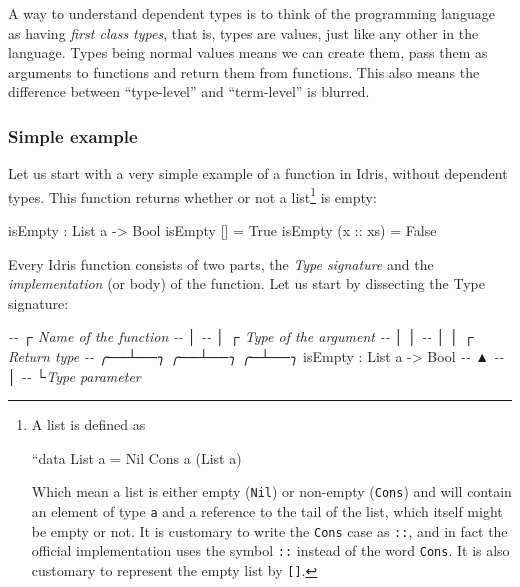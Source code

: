 \documentclass[
]{article}
\newenvironment{Shaded}{}{}
\newcommand{\CommentTok}[1]{\textcolor[rgb]{0.38,0.63,0.69}{\textit{#1}}}
\newcommand{\DataTypeTok}[1]{\textcolor[rgb]{0.56,0.13,0.00}{#1}}
\newcommand{\NormalTok}[1]{#1}
\newcommand{\OperatorTok}[1]{\textcolor[rgb]{0.40,0.40,0.40}{#1}}
\newcommand{\OtherTok}[1]{\textcolor[rgb]{0.00,0.44,0.13}{#1}}
\begin{document}
A way to understand dependent types is to think of the programming
language as having \emph{first class types}, that is, types are values,
just like any other in the language. Types being normal values means we
can create them, pass them as arguments to functions and return them
from functions. This also means the difference between ``type-level''
and ``term-level'' is blurred.

\hypertarget{simple-example}{%
\subsubsection{Simple example}\label{simple-example}}

Let us start with a very simple example of a function in Idris, without
dependent types. This function returns whether or not a list\footnote{A
  list is defined as

  ``data List a = Nil \textbar{} Cons a (List a)

  Which mean a list is either empty (\texttt{Nil}) or non-empty
  (\texttt{Cons}) and will contain an element of type \texttt{a} and a
  reference to the tail of the list, which itself might be empty or not.
  It is customary to write the \texttt{Cons} case as \texttt{::}, and in
  fact the official implementation uses the symbol \texttt{::} instead
  of the word \texttt{Cons}. It is also customary to represent the empty
  list by \texttt{{[}{]}}.} is empty:

\begin{Shaded}
\begin{Highlighting}[]
\NormalTok{isEmpty }\OperatorTok{:} \DataTypeTok{List}\NormalTok{ a }\OtherTok{{-}\textgreater{}} \DataTypeTok{Bool}
\NormalTok{isEmpty [] }\OtherTok{=} \DataTypeTok{True}
\NormalTok{isEmpty (}\OtherTok{x ::}\NormalTok{ xs) }\OtherTok{=} \DataTypeTok{False}
\end{Highlighting}
\end{Shaded}

Every Idris function consists of two parts, the \emph{Type signature}
and the \emph{implementation} (or body) of the function. Let us start by
dissecting the Type signature:

\begin{Shaded}
\begin{Highlighting}[]
\CommentTok{{-}{-}    ┌ Name of the function}
\CommentTok{{-}{-}    │ }
\CommentTok{{-}{-}    │         ┌ Type of the argument }
\CommentTok{{-}{-}    │         │ }
\CommentTok{{-}{-}    │         │       ┌ Return type            }
\CommentTok{{-}{-} ╭──┴──╮   ╭──┴──╮  ╭─┴──╮}
\NormalTok{   isEmpty }\OperatorTok{:} \DataTypeTok{List}\NormalTok{ a }\OtherTok{{-}\textgreater{}} \DataTypeTok{Bool}
\CommentTok{{-}{-}                ▲}
\CommentTok{{-}{-}                │ }
\CommentTok{{-}{-}                └Type parameter}
\end{Highlighting}
\end{Shaded}
\end{document}
